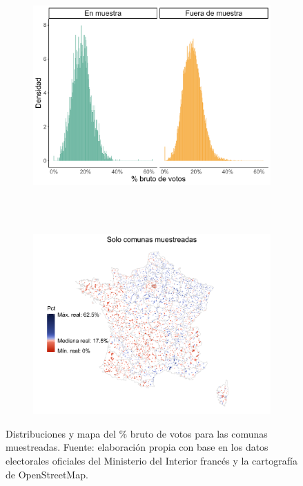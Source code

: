 \begin{figure}[H]
	\centering
	\begin{subfigure}{0.75\textwidth}
	\includegraphics[width = \textwidth]{Figs/AED/Distr_Votos_Br_P12_FN_MUESTRA}
	\caption{}
	\label{fig:Compara_Distr_Muestra}		
	\end{subfigure}\\
	~
	\begin{subfigure}{0.8\textwidth}
	\includegraphics[width = \textwidth]{Figs/AED/Mapa_Votos_Br_P12_FN_MUESTRA}
	\caption{}
	\label{fig:Mapa_Comunas_Muestra}
	\end{subfigure}
	\caption{Distribuciones y mapa del \% bruto de votos para las comunas muestreadas. Fuente: elaboración propia con base en los datos electorales oficiales del Ministerio del Interior francés y la cartografía de OpenStreetMap.}
\end{figure}

